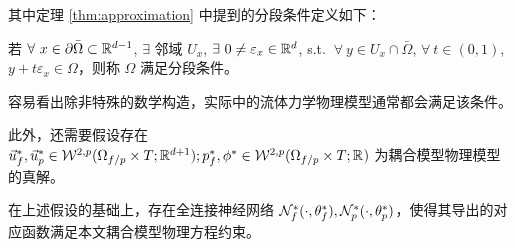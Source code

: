 其中定理 \ref{thm:approximation} 中提到的分段条件定义如下：
\cite[][]{}
\begin{definition}
若 $\forall ~ x \in \partial \bar{\Omega} \subset \R[d-1]$, $\exists \text{ 邻域 }U_x$, $\exists ~ 0 \neq \varepsilon_x \in \R[d]$, s.t. $~ \forall ~ y \in U_x \cap \bar{\Omega}$, $\forall ~ t \in (0,1)$, $y + t\varepsilon_x \in \Omega$，则称 $\Omega$ 满足分段条件。
\end{definition} 

容易看出除非特殊的数学构造，实际中的流体力学物理模型通常都会满足该条件。

此外，还需要假设存在 $\Uf^*,\Up^* \in \Wkp{2}(\Omega_{f/p} \times T; \R[d+1]); \pf^*,\pp^*  \in \Wkp{2}(\Omega_{f/p} \times T; \R)$ 为耦合模型物理模型的真解。

\begin{theorem}
在上述假设的基础上，存在全连接神经网络 $\NN^*_f(\cdot,\params^*_f),\NN^*_p(\cdot,\params^*_p)$，使得其导出的对应函数满足本文耦合模型物理方程约束。
\end{theorem}

